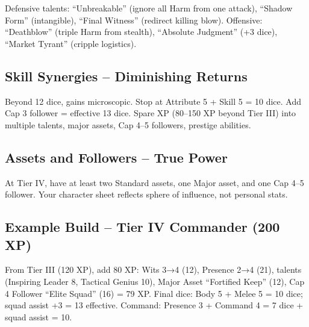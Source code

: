 \documentclass[11pt]{article}
\begin{document}
Defensive talents: ``Unbreakable'' (ignore all Harm from one attack), ``Shadow Form'' (intangible), ``Final Witness'' (redirect killing blow). Offensive: ``Deathblow'' (triple Harm from stealth), ``Absolute Judgment'' (+3 dice), ``Market Tyrant'' (cripple logistics).

\subsection{Skill Synergies – Diminishing Returns}
Beyond 12 dice, gains microscopic. Stop at Attribute 5 + Skill 5 = 10 dice. Add Cap 3 follower = effective 13 dice. Spare XP (80–150 XP beyond Tier III) into multiple talents, major assets, Cap 4–5 followers, prestige abilities.

\subsection{Assets and Followers – True Power}
At Tier IV, have at least two Standard assets, one Major asset, and one Cap 4–5 follower. Your character sheet reflects sphere of influence, not personal stats.

\subsection{Example Build – Tier IV Commander (200 XP)}
From Tier III (120 XP), add 80 XP: Wits 3→4 (12), Presence 2→4 (21), talents (Inspiring Leader 8, Tactical Genius 10), Major Asset ``Fortified Keep'' (12), Cap 4 Follower ``Elite Squad'' (16) = 79 XP. Final dice: Body 5 + Melee 5 = 10 dice; squad assist +3 = 13 effective. Command: Presence 3 + Command 4 = 7 dice + squad assist = 10.
\end{document}
